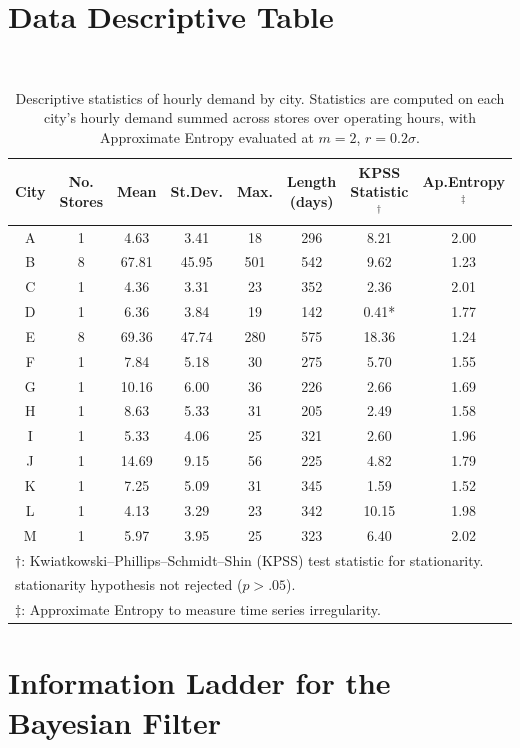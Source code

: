 \documentclass[preprint,11pt,authoryear]{elsarticle}
\theoremstyle{remark}
\begin{document}
\section{Data Descriptive Table}~\begin{table}[h!]
    \centering
    \begin{tabular}{cccccccc}
    \toprule
    City   & No. Stores & Mean   & St.Dev.   & Max.   & Length (days) & KPSS Statistic$^\dagger$ & Ap.Entropy$^\ddagger$ \\
    \midrule
    A & 1 & 4.63  & 3.41  & 18  & 296 & 8.21   & 2.00 \\
    B & 8 & 67.81 & 45.95 & 501 & 542 & 9.62   & 1.23 \\
    C & 1 & 4.36  & 3.31  & 23  & 352 & 2.36   & 2.01 \\
    D & 1 & 6.36  & 3.84  & 19  & 142 & 0.41*  & 1.77 \\
    E & 8 & 69.36 & 47.74 & 280 & 575 & 18.36  & 1.24 \\
    F & 1 & 7.84  & 5.18  & 30  & 275 & 5.70   & 1.55 \\
    G & 1 & 10.16 & 6.00  & 36  & 226 & 2.66   & 1.69 \\
    H & 1 & 8.63  & 5.33  & 31  & 205 & 2.49   & 1.58 \\
    I & 1 & 5.33  & 4.06  & 25  & 321 & 2.60   & 1.96 \\
    J & 1 & 14.69 & 9.15  & 56  & 225 & 4.82   & 1.79 \\
    K & 1 & 7.25  & 5.09  & 31  & 345 & 1.59   & 1.52 \\
    L & 1 & 4.13  & 3.29  & 23  & 342 & 10.15  & 1.98 \\
    M & 1 & 5.97  & 3.95  & 25  & 323 & 6.40   & 2.02 \\
    \bottomrule
    \multicolumn{8}{l}{$\dagger$: Kwiatkowski–Phillips–Schmidt–Shin (KPSS) test statistic for stationarity.}\\ 
    \multicolumn{8}{l}{ \quad * stationarity hypothesis not rejected ($p>.05$).}\\
    \multicolumn{8}{l}{$\ddagger$: Approximate Entropy to measure time series irregularity.}
    \end{tabular}%
\caption{Descriptive statistics of hourly demand by city. Statistics are computed on each city's hourly demand summed across stores over operating hours, with Approximate Entropy evaluated at $m=2$, $r=0.2\sigma$.}
  \label{table:descriptive}%
\end{table}%

\section{Information Ladder for the Bayesian Filter}
\label{app:info_ladder}
\end{document}
